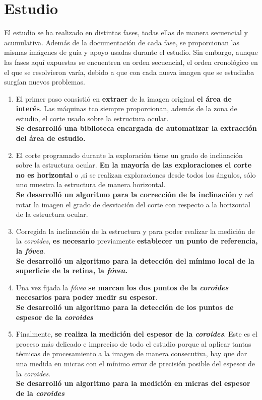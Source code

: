 \section{Estudio}
El estudio se ha realizado en distintas fases, todas ellas de manera
secuencial y acumulativa. Además de la documentación de cada fase, se
proporcionan las mismas imágenes de guía y apoyo usadas durante el
estudio.  Sin embargo, aunque las fases aquí expuestas se encuentren
en orden secuencial, el orden cronológico en el que se resolvieron
varía, debido a que con cada nueva imagen que se estudiaba surgían
nuevos problemas.
\begin{enumerate}
\item El primer paso consistió en \textbf{extraer} de la imagen
  original \textbf{el área de interés}. Las máquinas \gls{tco} siempre
  proporcionan, además
  de la zona de estudio, el corte usado sobre la estructura ocular. \\
  \textbf{Se desarrolló una biblioteca encargada de automatizar la
    extracción del área de estudio.}
\item El corte programado durante la exploración tiene un grado de
  inclinación sobre la estructura ocular. \textbf{En la mayoría de las
    exploraciones el corte no es horizontal} o ,si se realizan
  exploraciones desde todos los ángulos, sólo uno muestra la
  estructura
  de manera horizontal. \\
  \textbf{Se desarrolló un algoritmo para la corrección de la
    inclinación} y así rotar la imagen el grado de desviación del
  corte con respecto a la horizontal de la estructura ocular.
\item Corregida la inclinación de la estructura y para poder realizar
  la medición de la \emph{coroides}, \textbf{es necesario} previamente
  \textbf{establecer un punto de referencia, la \emph{fóvea}}. \\
  \textbf{Se desarrolló un algoritmo para la detección del mínimo
    local de la superficie de la retina, la \emph{fóvea}.}
\item Una vez fijada la \emph{fóvea} \textbf{se marcan los dos puntos
    de la \emph{coroides} necesarios para poder medir su espesor}. \\
  \textbf{Se desarrolló un algoritmo para la detección de los puntos
    de espesor de la \emph{coroides}}
\item Finalmente, \textbf{se realiza la medición del espesor de la
    \emph{coroides}}. Este es el proceso más delicado e impreciso de
  todo el estudio porque al aplicar tantas técnicas de procesamiento a
  la imagen de manera consecutiva, hay que dar una medida en micras
  con el mínimo error de precisión posible del espesor de la \emph{coroides}. \\
  \textbf{Se desarrolló un algoritmo para la medición en micras del
    espesor de la \emph{coroides}}
\end{enumerate}


